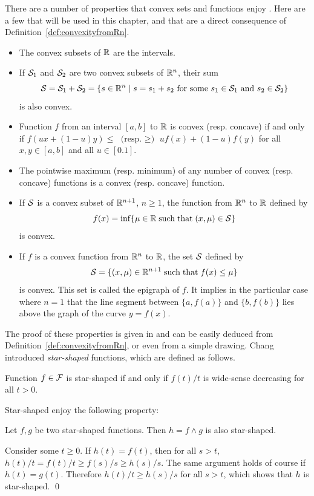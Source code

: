 There are a number of properties that convex sets and functions enjoy \cite{Roc}.
Here are a few that will be used in this chapter, and that are a direct consequence
of Definition~\ref{def:convexityfromRn}.
\begin{itemize}
\item{The convex subsets of $\mathbb{R}$ are the intervals.}
\item{If $\mathcal S_1$ and $\mathcal S_2$ are two convex subsets of $\mathbb{R}^{n}$, their sum
$$ \mathcal S = \mathcal S_1 + \mathcal S_2 = \left\{ s \in \mathbb{R}^{n} \; | \; s = s_1 + s_2 \mbox { for some } s_1 \in \mathcal S_1
\mbox{ and } s_2 \in \mathcal S_2 \right\} $$
is also convex.}
\item{Function $f$ from an interval $[a,b]$ to $\mathbb{R}$
is convex (resp. concave) if and only if $f(ux + (1-u)y) \leq \mbox{ (resp. $\geq$) }
uf(x) + (1-u)f(y)$ for all $x,y \in [a,b]$ and all $u \in [0.1]$.}
\item{The pointwise maximum (resp. minimum) of any number of convex (resp. concave) functions is
a convex (resp. concave) function.}
\item{If $\mathcal S$ is a convex subset of $\mathbb{R}^{n+1}$, $n \geq 1$, the function from $\mathbb{R}^{n}$ to $\mathbb{R}$
defined by
$$ f(x) = \inf \{ \mu \in \mathbb{R} \mathrm{\; such \; that \; } (x,\mu) \in \mathcal S \} $$
is convex.}
\item{If $f$ is a convex function from $\mathbb{R}^{n}$ to $\mathbb{R}$, the set $\mathcal S$ defined by
$$ \mathcal S = \{ (x,\mu) \in \mathbb{R}^{n+1} \mathrm{\; such \; that \; } f(x) \leq \mu \} $$
is convex. This set is called the epigraph of $f$. It implies in the particular case where $n=1$
that the line segment between $\{ a, f(a) \}$ and $\{ b, f(b) \}$ lies
above the graph of the curve $y = f(x)$.}
\end{itemize}
%
%
The proof of these properties is given in \cite{Roc} and can be easily deduced from Definition~\ref{def:convexityfromRn}, or even from a simple drawing.
Chang \cite{Changbook} introduced {\em star-shaped} functions, which are defined as follows.
\begin{definition}
Function $f \in \mathcal F$ is star-shaped if and only if $f(t)/t$ is wide-sense decreasing for all $t > 0$.
\end{definition}
Star-shaped  enjoy the following property:
\begin{theorem}
Let $f, g$ be two star-shaped functions. Then $h = f \wedge g$ is also star-shaped.
\end{theorem}
\pr Consider some $t \geq 0$. If $h(t) = f(t)$, then for all $s > t$,
$h(t)/t = f(t)/t \geq f(s)/s \geq h(s)/s$. The same argument holds of course if $h(t) = g(t)$.
Therefore $h(t)/t \geq h(s)/s$ for all $s > t$, which shows that $h$ is star-shaped.
\qed

